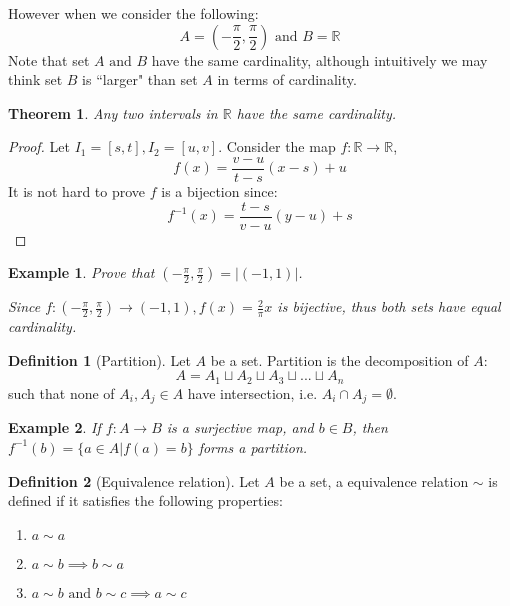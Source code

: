 \documentclass{article}
\theoremstyle{MyNonumberplain}
\theoremstyle{break}
\newtheorem*{proof}{Proof. }
\newcommand{\R}{\mathbb{R}}
\theoremstyle{break}
\newtheorem{theorem}{Theorem}[section]
\newtheorem{example}{Example}[section]
\theoremstyle{break}
\theoremstyle{definition}
\theoremstyle{break}
\newtheorem{definition}{Definition}[section]
\begin{document}
However when we consider the following:
\[ A = \left( - \frac{\pi}{2}, \frac{\pi}{2} \right) \text{ and } B = \mathbb{R}
\]
Note that set $A \text{ and } B$ have the same cardinality, although intuitively we may think
set $B$ is ``larger" than set $A$ in terms of cardinality.

\begin{thmbox}
    \begin{theorem}
        Any two intervals in $\R$ have the same cardinality.
    \end{theorem}
    \begin{prfbox}
        \begin{proof}
            Let $I_1=[s,t], I_2=[u,v]$. Consider the map $f:\R\to\R$,
            $$f(x)=\frac{v-u}{t-s}(x-s)+u$$
        It is not hard to prove $f$ is a bijection since:
            $$f^{-1}(x)=\frac{t-s}{v-u}(y-u)+s$$
        \end{proof}
    \end{prfbox}
\end{thmbox}



\begin{expbox}
    \begin{example}
        Prove that $(-\frac{\pi}{2},\frac{\pi}{2})=|(-1,1)|$.\bigskip

        Since $f:(-\frac{\pi}{2},\frac{\pi}{2})\to(-1,1),f(x)=\frac{2}{\pi}x$ is bijective, thus both sets have equal cardinality.
    \end{example}
\end{expbox}
\begin{defbox}
    \begin{definition}[Partition]
        Let $A$ be a set. Partition is the decomposition of $A$:
            $$A=A_1\sqcup A_2 \sqcup A_3 \sqcup ... \sqcup A_n$$
        such that none of $A_i,A_j\in A$ have intersection, i.e. $A_i\cap A_j=\emptyset$.
    \end{definition}  
\end{defbox}

\begin{expbox}
    \begin{example}
        If $f : A \to B$ is a surjective map, and $b \in B$, then $f^{- 1} (b) = \{ a \in A|f (a) = b \}$ forms a partition.
    \end{example}
\end{expbox}

\begin{defbox}
    \begin{definition}[Equivalence relation]
        Let $A$ be a set, a equivalence relation $\sim$ is defined if it satisfies the following properties:
        \begin{enumerate}
            \item $a \sim a$ \bigskip
            \item $a \sim b \implies b \sim a$\bigskip
            \item $a \sim b \text{ and } b \sim c \implies a \sim c$
        \end{enumerate}
    \end{definition}
\end{defbox}
\end{document}
